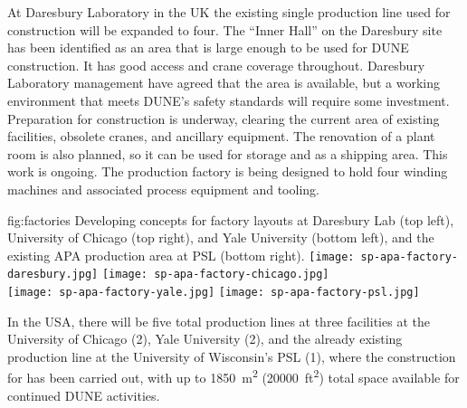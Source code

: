 At Daresbury Laboratory in the UK the existing single production line used for  construction will be expanded to four.  The ``Inner Hall'' on the Daresbury site has been identified as an area that is large enough to be used for DUNE  construction. It has good access and crane coverage throughout. Daresbury Laboratory management have agreed that the area is available, but a working environment that meets DUNE's safety standards will require some investment. Preparation for construction is underway, clearing the current area of existing facilities, obsolete cranes, and ancillary equipment. The renovation of a plant room is also planned, so it can be used for storage and as a shipping area. This work is ongoing. The production factory is being designed to hold four winding machines and associated process equipment and tooling.  

\begin{dunefigure}{fig:factories}
{Developing concepts for factory layouts at Daresbury Lab (top left), University of Chicago (top right), and Yale University (bottom left), and the existing APA production area at PSL %
(bottom right).}
\texttt{[image: sp-apa-factory-daresbury.jpg]} 
\texttt{[image: sp-apa-factory-chicago.jpg]} \\
\vspace{1mm}
\texttt{[image: sp-apa-factory-yale.jpg]}
\texttt{[image: sp-apa-factory-psl.jpg]} 
\end{dunefigure}

In the USA, there will be five total production lines at three facilities at the University of Chicago (2), Yale University (2), and the already existing production line at the University of Wisconsin's PSL (1), %
where the construction for  has been carried out, with up to \SI{1850}{m^2} (\SI{20000}{ft^2}) total space available for continued DUNE activities. 

